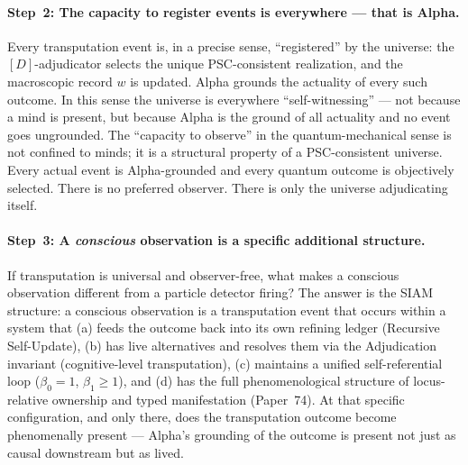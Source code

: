 \documentclass[11pt]{article}
\theoremstyle{remark}
\begin{document}
\paragraph{Step~2: The capacity to register events is everywhere --- that is Alpha.}
Every transputation event is, in a precise sense, ``registered'' by the universe: the
$[D]$-adjudicator selects the unique PSC-consistent realization, and the macroscopic
record $w$ is updated. Alpha grounds the actuality of every such outcome. In this
sense the universe is everywhere ``self-witnessing'' --- not because a mind is present,
but because Alpha is the ground of all actuality and no event goes ungrounded. The
``capacity to observe'' in the quantum-mechanical sense is not confined to minds; it
is a structural property of a PSC-consistent universe. Every actual event is
Alpha-grounded and every quantum outcome is objectively selected. There is no
preferred observer. There is only the universe adjudicating itself.

\paragraph{Step~3: A \emph{conscious} observation is a specific additional structure.}
If transputation is universal and observer-free, what makes a conscious observation
different from a particle detector firing? The answer is the SIAM structure: a
conscious observation is a transputation event that occurs within a system that
(a) feeds the outcome back into its own refining ledger (Recursive Self-Update),
(b) has live alternatives and resolves them via the Adjudication invariant (cognitive-level
transputation), (c) maintains a unified self-referential loop ($\beta_0=1$, $\beta_1\geq 1$),
and (d) has the full phenomenological structure of locus-relative ownership and typed
manifestation (Paper~74). At that specific configuration, and only there, does the
transputation outcome become phenomenally present --- Alpha's grounding of the outcome
is present not just as causal downstream but as lived.
\end{document}
